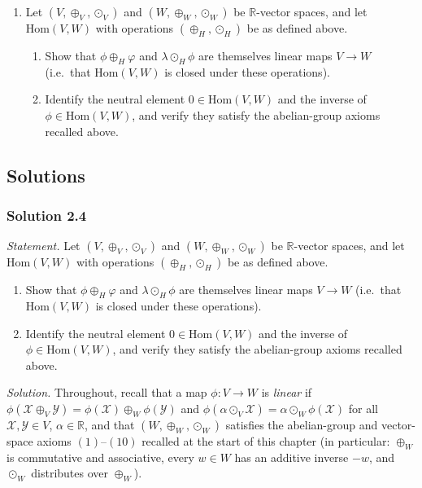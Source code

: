 \documentclass[11pt]{article}
\begin{document}
\begin{enumerate}[label=\textbf{2.\arabic*}, leftmargin=2.2cm, start=4]

\item \label{prob:hom-space}
Let $(V,\oplus_V,\odot_V)$ and $(W,\oplus_W,\odot_W)$ be $\mathbb{R}$-vector spaces, and let $\mathrm{Hom}(V,W)$ with operations $(\oplus_H, \odot_H)$ be as defined above.
\begin{enumerate}[label=(\alph*)]
  \item Show that $\phi \oplus_H \varphi$ and $\lambda \odot_H \phi$ are themselves linear maps $V \to W$ (i.e.\ that $\mathrm{Hom}(V,W)$ is closed under these operations).
  \item Identify the neutral element $0 \in \mathrm{Hom}(V,W)$ and the inverse of $\phi \in \mathrm{Hom}(V,W)$, and verify they satisfy the abelian-group axioms recalled above.
\end{enumerate}

\end{enumerate}

\subsection*{Solutions}

\subsubsection*{Solution 2.4}

\noindent\textit{Statement.} Let $(V,\oplus_V,\odot_V)$ and $(W,\oplus_W,\odot_W)$ be $\mathbb{R}$-vector spaces, and let $\mathrm{Hom}(V,W)$ with operations $(\oplus_H,\odot_H)$ be as defined above.
\begin{enumerate}[label=(\alph*)]
  \item Show that $\phi \oplus_H \varphi$ and $\lambda \odot_H \phi$ are themselves linear maps $V \to W$ (i.e.\ that $\mathrm{Hom}(V,W)$ is closed under these operations).
  \item Identify the neutral element $0 \in \mathrm{Hom}(V,W)$ and the inverse of $\phi \in \mathrm{Hom}(V,W)$, and verify they satisfy the abelian-group axioms recalled above.
\end{enumerate}

\medskip
\noindent\textit{Solution.} Throughout, recall that a map $\phi:V\to W$ is \emph{linear} if $\phi(\mathcal X\oplus_V\mathcal Y)=\phi(\mathcal X)\oplus_W\phi(\mathcal Y)$ and $\phi(\alpha\odot_V\mathcal X)=\alpha\odot_W\phi(\mathcal X)$ for all $\mathcal X,\mathcal Y\in V$, $\alpha\in\mathbb R$, and that $(W,\oplus_W,\odot_W)$ satisfies the abelian-group and vector-space axioms $(1)$--$(10)$ recalled at the start of this chapter (in particular: $\oplus_W$ is commutative and associative, every $w\in W$ has an additive inverse $-w$, and $\odot_W$ distributes over $\oplus_W$).
\end{document}
